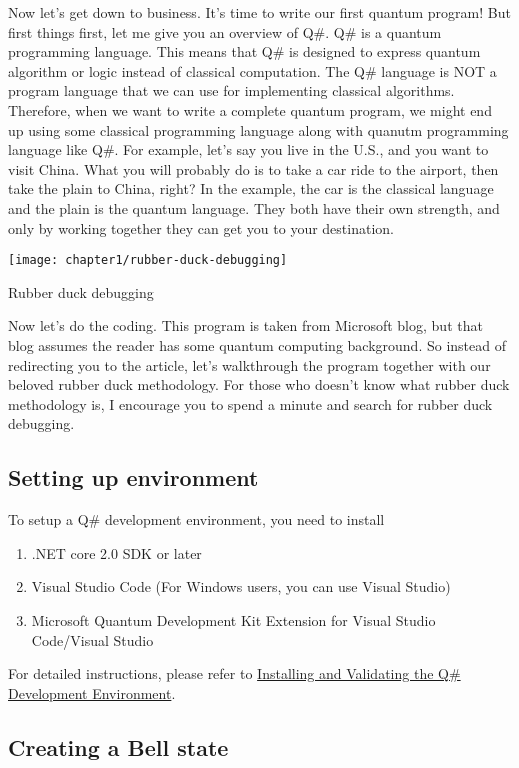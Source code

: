 \begin{fullwidth}

Now let's get down to business. It's time to write our first quantum program!
But first things first, let me give you an overview of Q\#.
Q\# is a quantum programming language.
This means that Q\# is designed to express quantum algorithm or logic instead of classical computation.
The Q\# language is NOT a program language that we can use for implementing classical algorithms.
Therefore, when we want to write a complete quantum program, we might end up using some classical programming language along with quanutm programming language like Q\#.
For example, let's say you live in the U.S., and you want to visit China.
What you will probably do is to take a car ride to the airport, then take the plain to China, right?
In the example, the car is the classical language and the plain is the quantum language.
They both have their own strength, and only by working together they can get you to your destination.

\end{fullwidth}


\begin{marginfigure}[16\baselineskip]
    \texttt{[image: chapter1/rubber-duck-debugging]}
    \caption{Rubber duck debugging}
    \label{fig:chapter1-rubber-duck-picture}
\end{marginfigure}

Now let's do the coding.
This program is taken from Microsoft blog\cite{Chapter1-first-quantum-program}, but that blog assumes the reader has some quantum computing background.
So instead of redirecting you to the article, let's walkthrough the program together with our beloved rubber duck methodology\cite{Chapter1-rubber-duck}.
For those who doesn't know what rubber duck methodology is, I encourage you to spend a minute and search for rubber duck debugging.

\subsection{Setting up environment}
To setup a Q\# development environment, you need to install
\begin{enumerate}
  \item .NET core 2.0 SDK or later
  \item Visual Studio Code (For Windows users, you can use Visual Studio)
  \item Microsoft Quantum Development Kit Extension for Visual Studio Code/Visual Studio
\end{enumerate}
For detailed instructions, please refer to
\href{https://docs.microsoft.com/en-us/quantum/quantum-installconfig?view=qsharp-preview&tabs=tabid-vscode}{Installing and Validating the Q\# Development Environment}\cite{Chapter1-setup-environment}.

\subsection{Creating a Bell state}

